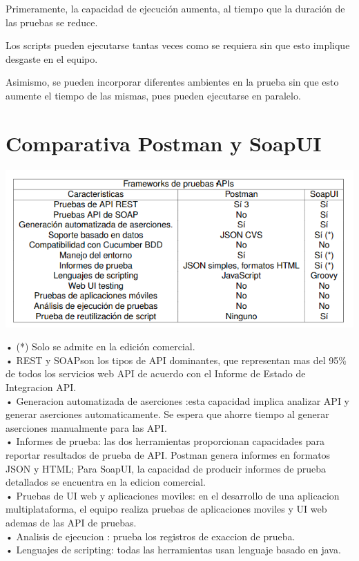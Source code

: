 \documentclass[twocolumn]{article}
\begin{document}
Primeramente, la capacidad de ejecución aumenta, al tiempo que la duración de las pruebas se reduce.


Los scripts pueden ejecutarse tantas veces como se requiera sin que esto implique desgaste en el equipo.


Asimismo, se pueden incorporar diferentes ambientes en la prueba sin que esto aumente el tiempo de las mismas, pues pueden ejecutarse en paralelo.

\section{Comparativa Postman y SoapUI}
\includegraphics[width=1\linewidth]{img/tabla.png}


  • (*) Solo se admite en la edición comercial.
\\ • REST y SOAPson los tipos de API dominantes, que representan mas del 95\% de 
todos los servicios web  API de acuerdo con el Informe de Estado de Integracion API. 
\\• Generacion automatizada de aserciones :esta capacidad implica analizar API y generar
 aserciones automaticamente. Se espera que ahorre tiempo al generar aserciones manualmente 
 para las API.
 \\ • Informes de prueba: las dos herramientas proporcionan capacidades para reportar resultados 
 de prueba de API. Postman genera informes en formatos JSON y HTML; Para SoapUI, la capacidad 
 de producir informes de prueba detallados se encuentra en la edicion comercial.
 \\•  Pruebas de UI web y aplicaciones moviles: en el desarrollo de una aplicacion multiplataforma, el equipo realiza pruebas de aplicaciones moviles y UI web ademas de las API de pruebas. 
\\•  Analisis de ejecucion : prueba los registros de exaccion de prueba.
\\• Lenguajes de scripting: todas las herramientas usan lenguaje basado en java.
\newpage
\end{document}
